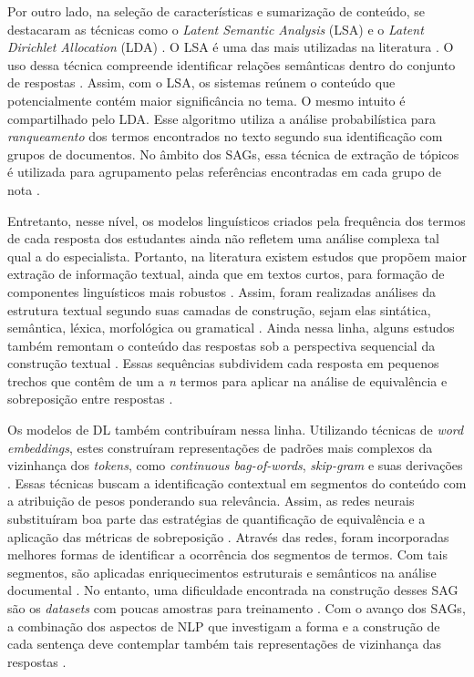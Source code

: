 Por outro lado, na seleção de características e sumarização de conteúdo, se destacaram as técnicas como o \textit{Latent Semantic Analysis} (LSA) \cite{landauer1998} e o \textit{Latent Dirichlet Allocation} (LDA) \cite{blei2003}. O LSA é uma das mais utilizadas na literatura \cite{basu2013, sahu2020}. O uso dessa técnica compreende identificar relações semânticas dentro do conjunto de respostas \cite{mohler2009}. Assim, com o LSA, os sistemas reúnem o conteúdo que potencialmente contém maior significância no tema. O mesmo intuito é compartilhado pelo LDA. Esse algoritmo utiliza a análise probabilística para \textit{ranqueamento} dos termos encontrados no texto segundo sua identificação com grupos de documentos. No âmbito dos SAGs, essa técnica de extração de tópicos é utilizada para agrupamento pelas referências encontradas em cada grupo de nota \cite{basu2013, zhang2022}.

Entretanto, nesse nível, os modelos linguísticos criados pela frequência dos termos de cada resposta dos estudantes ainda não refletem uma análise complexa tal qual a do especialista. Portanto, na literatura existem estudos que propõem maior extração de informação textual, ainda que em textos curtos, para formação de componentes linguísticos mais robustos \cite{saha2018, zesch2018}. Assim, foram realizadas análises da estrutura textual segundo suas camadas de construção, sejam elas sintática, semântica, léxica, morfológica ou gramatical \cite{ramachandran2015b, roy2016}. Ainda nessa linha, alguns estudos também remontam o conteúdo das respostas sob a perspectiva sequencial da construção textual \cite{kumar2017}. Essas sequências subdividem cada resposta em pequenos trechos que contêm de um a \textit{n} termos para aplicar na análise de equivalência e sobreposição entre respostas \cite{jimenez2013, sakaguchi2015, sultan2016}.

Os modelos de DL também contribuíram nessa linha. Utilizando técnicas de \textit{word embeddings}, estes construíram representações de padrões mais complexos da vizinhança dos \textit{tokens}, como \textit{continuous bag-of-words}, \textit{skip-gram} e suas derivações \cite{mikolov2013}. Essas técnicas buscam a identificação contextual em segmentos do conteúdo com a atribuição de pesos ponderando sua relevância. Assim, as redes neurais substituíram boa parte das estratégias de quantificação de equivalência e a aplicação das métricas de sobreposição \cite{haller2022}. Através das redes, foram incorporadas melhores formas de identificar a ocorrência dos segmentos de termos. Com tais segmentos, são aplicadas enriquecimentos estruturais e semânticos na análise documental \cite{camus2020}. No entanto, uma dificuldade encontrada na construção desses SAG são os \textit{datasets} com poucas amostras para treinamento \cite{bonthu2021}. Com o avanço dos SAGs, a combinação dos aspectos de NLP que investigam a forma e a construção de cada sentença deve contemplar também tais representações de vizinhança das respostas \cite{riordan2019, kumar2019}.


